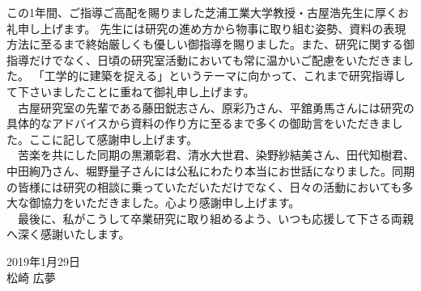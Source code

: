 \begin{acknowledgment}
\thispagestyle{fancy}
この1年間、ご指導ご高配を賜りました芝浦工業大学教授・古屋浩先生に厚くお礼申し上げます。
先生には研究の進め方から物事に取り組む姿勢、資料の表現方法に至るまで終始厳しくも優しい御指導を賜りました。また、研究に関する御指導だけでなく、日頃の研究室活動においても常に温かいご配慮をいただきました。
「工学的に建築を捉える」というテーマに向かって、これまで研究指導して下さいましたことに重ねて御礼申し上げます。
\\　古屋研究室の先輩である藤田鋭志さん、原彩乃さん、平舘勇馬さんには研究の具体的なアドバイスから資料の作り方に至るまで多くの御助言をいただきました。ここに記して感謝申し上げます。
\\　苦楽を共にした同期の黒瀬彰君、清水大世君、染野紗結美さん、田代知樹君、中田絢乃さん、堀野量子さんには公私にわたり本当にお世話になりました。同期の皆様には研究の相談に乗っていただいただけでなく、日々の活動においても多大な御協力をいただきました。心より感謝申し上げます。
\\　最後に、私がこうして卒業研究に取り組めるよう、いつも応援して下さる両親へ深く感謝いたします。
\\
\begin{flushright}
2019年1月29日\\
松崎 広夢
\end{flushright}
\end{acknowledgment}
